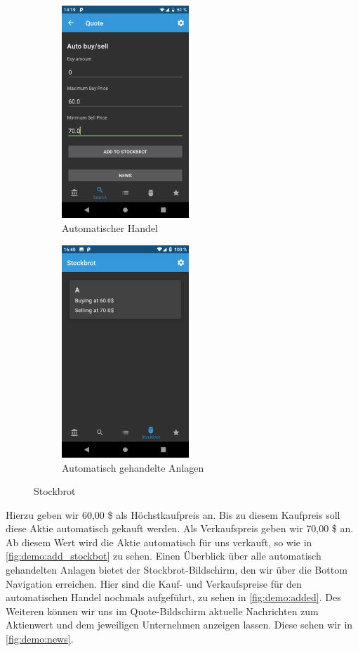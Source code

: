 \documentclass[a4paper]{article}
\begin{document}
\begin{figure}[H]
	\begin{subfigure}{.5\textwidth}
		\centering
		\includegraphics[height=8cm,keepaspectratio]{./images/demo/add_stockbot.png}
		\caption{Automatischer Handel}
		\label{fig:demo:add_stockbot}
	\end{subfigure}
	\begin{subfigure}{.5\textwidth}
		\centering
		\includegraphics[height=8cm,keepaspectratio]{./images/demo/added_stockbot_view.png}
		\caption{Automatisch gehandelte Anlagen}
		\label{fig:demo:added}
	\end{subfigure}
	\caption{Stockbrot}
	\label{fig:demo:bot}
\end{figure}

Hierzu geben wir 60,00 \$ als Höchstkaufpreis an. Bis zu diesem Kaufpreis soll diese Aktie automatisch gekauft werden. Als Verkaufspreis geben wir 70,00 \$ an. Ab diesem Wert wird die Aktie automatisch für uns verkauft, so wie in \autoref{fig:demo:add_stockbot} zu sehen. Einen Überblick über alle automatisch gehandelten Anlagen bietet der Stockbrot-Bildschirm, den wir über die Bottom Navigation erreichen. Hier sind die Kauf- und Verkaufspreise für den automatischen Handel nochmals aufgeführt, zu sehen in  \autoref{fig:demo:added}.\newline
Des Weiteren können wir uns im Quote-Bildschirm aktuelle Nachrichten zum Aktienwert und dem jeweiligen Unternehmen anzeigen lassen. Diese sehen wir in \autoref{fig:demo:news}.
\end{document}
